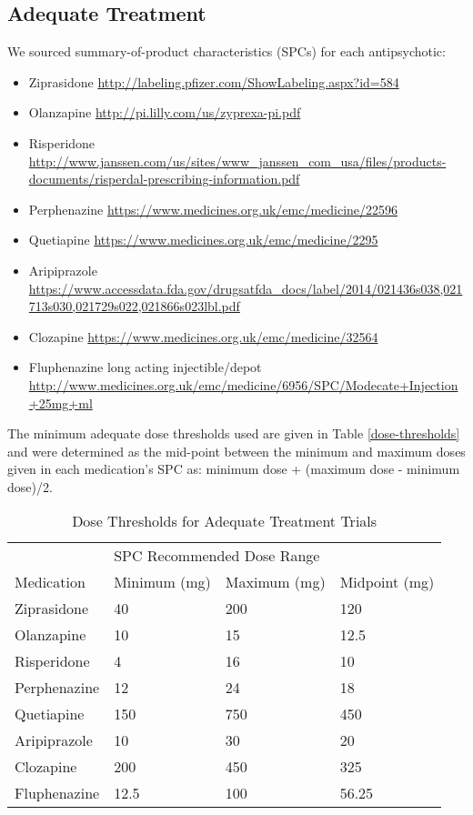 \documentclass[a4paper,nobib]{article}
\begin{document}
\subsection{Adequate Treatment}
We sourced summary-of-product characteristics (SPCs) for each antipsychotic:
\begin{itemize}
	\item Ziprasidone \url{http://labeling.pfizer.com/ShowLabeling.aspx?id=584}
	\item Olanzapine \url{http://pi.lilly.com/us/zyprexa-pi.pdf}
	\item Risperidone \url{http://www.janssen.com/us/sites/www_janssen_com_usa/files/products-documents/risperdal-prescribing-information.pdf}
	\item Perphenazine \url{https://www.medicines.org.uk/emc/medicine/22596}
	\item Quetiapine \url{https://www.medicines.org.uk/emc/medicine/2295}
	\item Aripiprazole \url{https://www.accessdata.fda.gov/drugsatfda_docs/label/2014/021436s038,021713s030,021729s022,021866s023lbl.pdf}
	\item Clozapine \url{https://www.medicines.org.uk/emc/medicine/32564}
	\item Fluphenazine long acting injectible/depot \url{http://www.medicines.org.uk/emc/medicine/6956/SPC/Modecate+Injection+25mg+ml}
\end{itemize}
The minimum adequate dose thresholds used are given in Table \ref{dose-thresholds} and were determined as the mid-point between the minimum and maximum doses given in each medication's SPC as: minimum dose + (maximum dose - minimum dose)/2.  
\begin{table}[]
	\centering
	\label{dose-thresholds}
	\begin{tabular}{llll}
		& \multicolumn{2}{l}{SPC Recommended Dose Range} &          		\\
		Medication & Minimum (mg)     & Maximum (mg)  	  & Midpoint (mg) 	\\
		\hline
		Ziprasidone& 40 	          & 200 	          & 120    			\\
		Olanzapine & 10 			  & 15				  & 12.5   			\\
		Risperidone& 4 				  & 16				  & 10 				\\
		Perphenazine&12				  & 24				  & 18				\\
		Quetiapine&	 150			  & 750 			  & 450     		\\
		Aripiprazole&10				  & 30				  & 20				\\
		Clozapine& 	 200			  & 450				  & 325				\\
		Fluphenazine&12.5			  & 100				  & 56.25			\\
		\hline
		
	\end{tabular}
	\caption{Dose Thresholds for Adequate Treatment Trials}
	\label{SI:tab-meds-dose}
\end{table}
\end{document}
